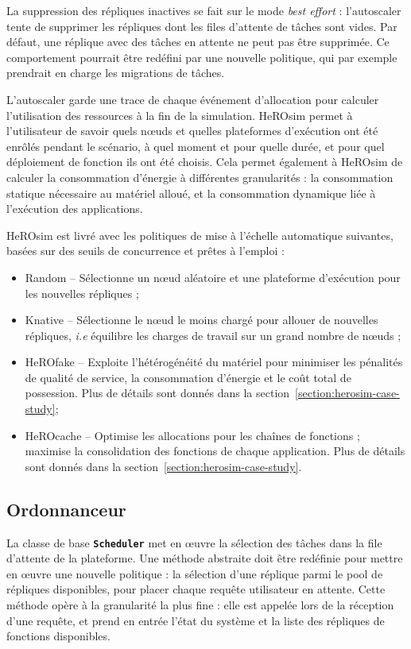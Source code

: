 La suppression des répliques inactives se fait sur le mode \textit{best effort} : l'autoscaler tente de supprimer les répliques dont les files d'attente de tâches sont vides. Par défaut, une réplique avec des tâches en attente ne peut pas être supprimée. Ce comportement pourrait être redéfini par une nouvelle politique, qui par exemple prendrait en charge les migrations de tâches.

L'autoscaler garde une trace de chaque événement d'allocation pour calculer l'utilisation des ressources à la fin de la simulation. HeROsim permet à l'utilisateur de savoir quels nœuds et quelles plateformes d'exécution ont été enrôlés pendant le scénario, à quel moment et pour quelle durée, et pour quel déploiement de fonction ils ont été choisis. Cela permet également à HeROsim de calculer la consommation d'énergie à différentes granularités : la consommation statique nécessaire au matériel alloué, et la consommation dynamique liée à l'exécution des applications.

HeROsim est livré avec les politiques de mise à l'échelle automatique suivantes, basées sur des seuils de concurrence et prêtes à l'emploi :

\begin{itemize}
    \item Random -- Sélectionne un nœud aléatoire et une plateforme d'exécution pour les nouvelles répliques ;
    \item Knative -- Sélectionne le nœud le moins chargé pour allouer de nouvelles répliques, \textit{i.e} équilibre les charges de travail sur un grand nombre de nœuds ;
    \item HeROfake -- Exploite l'hétérogénéité du matériel pour minimiser les pénalités de qualité de service, la consommation d'énergie et le coût total de possession. Plus de détails sont donnés dans la section~\ref{section:herosim-case-study};
    \item HeROcache -- Optimise les allocations pour les chaînes de fonctions ; maximise la consolidation des fonctions de chaque application. Plus de détails sont donnés dans la section~\ref{section:herosim-case-study}.
\end{itemize}

\subsection{Ordonnanceur}

La classe de base \textbf{\texttt{Scheduler}} met en œuvre la sélection des tâches dans la file d'attente de la plateforme. Une méthode abstraite doit être redéfinie pour mettre en œuvre une nouvelle politique : la sélection d'une réplique parmi le pool de répliques disponibles, pour placer chaque requête utilisateur en attente. Cette méthode opère à la granularité la plus fine : elle est appelée lors de la réception d'une requête, et prend en entrée l'état du système et la liste des répliques de fonctions disponibles.

